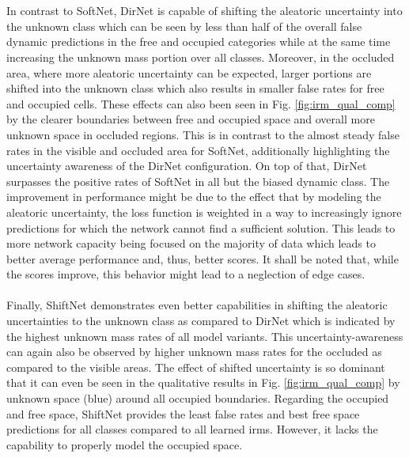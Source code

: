 \\\\
In contrast to SoftNet, DirNet is capable of shifting the aleatoric uncertainty into the unknown class which can be seen by less than half of the overall false dynamic predictions in the free and occupied categories while at the same time increasing the unknown mass portion over all classes. Moreover, in the occluded area, where more aleatoric uncertainty can be expected, larger portions are shifted into the unknown class which also results in smaller false rates for free and occupied cells. These effects can also been seen in Fig. \ref{fig:irm_qual_comp} by the clearer boundaries between free and occupied space and overall more unknown space in occluded regions. This is in contrast to the almost steady false rates in the visible and occluded area for SoftNet, additionally highlighting the uncertainty awareness of the DirNet configuration. On top of that, DirNet surpasses the positive rates of SoftNet in all but the biased dynamic class. The improvement in performance might be due to the effect that by modeling the aleatoric uncertainty, the loss function is weighted in a way to increasingly ignore predictions for which the network cannot find a sufficient solution. This leads to more network capacity being focused on the majority of data which leads to better average performance and, thus, better scores. It shall be noted that, while the scores improve, this behavior might lead to a neglection of edge cases.
\\\\
Finally, ShiftNet demonstrates even better capabilities in shifting the aleatoric uncertainties to the unknown class as compared to DirNet which is indicated by the highest unknown mass rates of all model variants. This uncertainty-awareness can again also be observed by higher unknown mass rates for the occluded as compared to the visible areas. The effect of shifted uncertainty is so dominant that it can even be seen in the qualitative results in Fig. \ref{fig:irm_qual_comp} by unknown space (blue) around all occupied boundaries. Regarding the occupied and free space, ShiftNet provides the least false rates and best free space predictions for all classes compared to all learned \gls{irm}s. However, it lacks the capability to properly model the occupied space.  
\\\\
